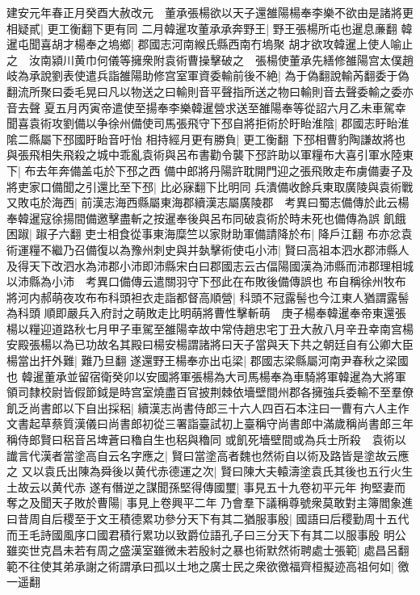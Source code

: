 建安元年春正月癸酉大赦改元　董承張楊欲以天子還雒陽楊奉李樂不欲由是諸將更相疑貳|{
	更工衡翻下更有同}
二月韓暹攻董承承奔野王|{
	野王張楊所屯也暹息亷翻}
韓暹屯聞喜胡才楊奉之塢鄉|{
	郡國志河南緱氏縣西南冇塢聚}
胡才欲攻韓暹上使人喻止之　汝南潁川黄巾何儀等擁衆附袁術曹操擊破之　張楊使董承先繕修雒陽宫太僕趙岐為承說劉表使遣兵詣雒陽助修宫室軍資委輸前後不絶|{
	為于偽翻說輸芮翻委于偽翻流所聚曰委毛晃曰凡以物送之曰輸則音平聲指所送之物曰輸則音去聲委輸之委亦音去聲}
夏五月丙寅帝遣使至揚奉李樂韓暹營求送至雒陽奉等從詔六月乙未車駕幸聞喜袁術攻劉備以争徐州備使司馬張飛守下邳自將拒術於盱眙淮陰|{
	郡國志盱眙淮隂二縣屬下邳國盱眙音吁怡}
相持經月更有勝負|{
	更工衡翻}
下邳相曹豹陶謙故將也與張飛相失飛殺之城中乖亂袁術與呂布書勸令襲下邳許助以軍糧布大喜引軍水陸東下|{
	布去年奔備盖屯於下邳之西}
備中郎將丹陽許耽開門迎之張飛敗走布虜備妻子及將吏家口備聞之引還比至下邳|{
	比必寐翻下比明同}
兵潰備收餘兵東取廣陵與袁術戰又敗屯於海西|{
	前漢志海西縣屬東海郡續漢志屬廣陵郡　考異曰蜀志備傳於此云楊奉韓暹寇徐揚間備邀擊盡斬之按暹奉後與呂布同破袁術於時未死也備傳為誤}
飢餓困踧|{
	踧子六翻}
吏士相食從事東海糜竺以家財助軍備請降於布|{
	降戶江翻}
布亦忿袁術運糧不繼乃召備復以為豫州刺史與并埶擊術使屯小沛|{
	賢曰高祖本泗水郡沛縣人及得天下改泗水為沛郡小沛即沛縣宋白曰郡國志云古偪陽國漢為沛縣而沛郡理相城以沛縣為小沛　考異口備傳云遣關羽守下邳此在布敗後備傳誤也}
布自稱徐州牧布將河内郝萌夜攻布布科頭袒衣走詣都督高順營|{
	科頭不冠露髻也今江東人猶謂露髻為科頭}
順即嚴兵入府討之萌敗走比明萌將曹性擊斬萌　庚子楊奉韓暹奉帝東還張楊以糧迎道路秋七月甲子車駕至雒陽幸故中常侍趙忠宅丁丑大赦八月辛丑幸南宫楊安殿張楊以為已功故名其殿曰楊安楊謂諸將曰天子當與天下共之朝廷自有公卿大臣楊當出扞外難|{
	難乃旦翻}
遂還野王楊奉亦出屯梁|{
	郡國志梁縣屬河南尹春秋之梁國也}
韓暹董承並留宿衛癸卯以安國將軍張楊為大司馬楊奉為車騎將軍韓暹為大將軍領司隸校尉皆假節鉞是時宫室燒盡百官披荆棘依墻壁間州郡各擁強兵委輸不至羣僚飢乏尚書郎以下自出採稆|{
	續漢志尚書侍郎三十六人四百石本注曰一曹有六人主作文書起草蔡質漢儀曰尚書郎初從三署詣臺試初上臺稱守尚書郎中滿歲稱尚書郎三年稱侍郎賢曰稆音呂埤蒼曰穭自生也稆與穭同}
或飢死墻壁間或為兵士所殺　袁術以䜟言代漢者當塗高自云名字應之|{
	賢曰當塗高者魏也然術自以術及路皆是塗故云應之}
又以袁氏出陳為舜後以黄代赤德運之次|{
	賢曰陳大夫轅濤塗袁氏其後也五行火生土故云以黄代赤}
遂有僭逆之謀聞孫堅得傳國璽|{
	事見五十九卷初平元年}
拘堅妻而奪之及聞天子敗於曹陽|{
	事見上卷興平二年}
乃會羣下議稱尊號衆莫敢對主簿閻象進曰昔周自后稷至于文王積德累功參分天下有其二猶服事殷|{
	國語曰后稷勤周十五代而王毛詩國風序口國君積行累功以致爵位語孔子曰三分天下有其二以服事殷}
明公雖奕世克昌未若有周之盛漢室雖微未若殷紂之暴也術默然術聘處士張範|{
	處昌呂翻}
範不往使其弟承謝之術謂承曰孤以土地之廣士民之衆欲徼福齊桓擬迹高祖何如|{
	徼一遥翻}
